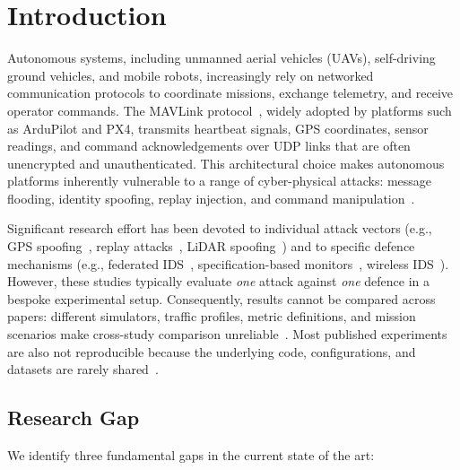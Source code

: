 \section{Introduction} \label{sec:intro}

Autonomous systems, including unmanned aerial vehicles (UAVs), self-driving ground vehicles, and mobile robots, increasingly rely on networked communication protocols to coordinate missions, exchange telemetry, and receive operator commands.
The MAVLink protocol~\cite{mavlink2024}, widely adopted by platforms such as ArduPilot and PX4, transmits heartbeat signals, GPS coordinates, sensor readings, and command acknowledgements over UDP links that are often unencrypted and unauthenticated.
This architectural choice makes autonomous platforms inherently vulnerable to a range of cyber-physical attacks: message flooding, identity spoofing, replay injection, and command manipulation~\cite{mekdad2023uavsecurity, neshenko2019iot, cui2010embedded}.

Significant research effort has been devoted to individual attack vectors (e.g., GPS spoofing~\cite{shoukry2017safecontrol}, replay attacks~\cite{mo2009replay}, LiDAR spoofing~\cite{sun2020lidar}) and to specific defence mechanisms (e.g., federated IDS~\cite{nguyen2021fliot}, specification-based monitors~\cite{bartocci2018specmonitoring}, wireless IDS~\cite{mitchell2014wireless}).
However, these studies typically evaluate \emph{one} attack against \emph{one} defence in a bespoke experimental setup.
Consequently, results cannot be compared across papers: different simulators, traffic profiles, metric definitions, and mission scenarios make cross-study comparison unreliable~\cite{sommer2010closedworld}.
Most published experiments are also not reproducible because the underlying code, configurations, and datasets are rarely shared~\cite{collberg2016repeatability}.

\subsection{Research Gap}

We identify three fundamental gaps in the current state of the art:

